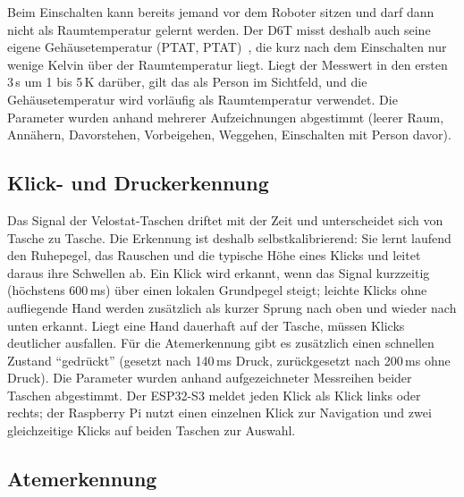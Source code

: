 Beim Einschalten kann bereits jemand vor dem Roboter sitzen und darf dann nicht als
Raumtemperatur gelernt werden. Der D6T misst deshalb auch seine eigene Gehäusetemperatur
(\acl{PTAT}, \acs{PTAT})~\cite{jamil2026mainboard}, die kurz nach dem Einschalten nur wenige Kelvin über der
Raumtemperatur liegt. Liegt der Messwert in den ersten 3\,s um 1 bis 5\,K darüber, gilt das als
Person im Sichtfeld, und die Gehäusetemperatur wird vorläufig als Raumtemperatur verwendet. Die
Parameter wurden anhand mehrerer Aufzeichnungen abgestimmt (leerer Raum, Annähern, Davorstehen,
Vorbeigehen, Weggehen, Einschalten mit Person davor).

\subsection{Klick- und Druckerkennung}
\label{sec:sw_druck}

Das Signal der Velostat-Taschen driftet mit der Zeit und unterscheidet sich von Tasche zu
Tasche. Die Erkennung ist deshalb selbstkalibrierend: Sie lernt laufend den Ruhepegel, das
Rauschen und die typische Höhe eines Klicks und leitet daraus ihre Schwellen ab. Ein Klick
wird erkannt, wenn das Signal kurzzeitig (höchstens 600\,ms) über einen lokalen Grundpegel
steigt; leichte Klicks ohne aufliegende Hand werden zusätzlich als kurzer Sprung nach oben und
wieder nach unten erkannt. Liegt eine Hand dauerhaft auf der Tasche, müssen Klicks deutlicher
ausfallen. Für die Atemerkennung gibt es zusätzlich einen schnellen Zustand \enquote{gedrückt}
(gesetzt nach 140\,ms Druck, zurückgesetzt nach 200\,ms ohne Druck). Die Parameter wurden anhand
aufgezeichneter Messreihen beider Taschen abgestimmt. Der ESP32-S3 meldet jeden Klick als Klick
links oder rechts; der Raspberry Pi nutzt einen einzelnen Klick zur Navigation und zwei
gleichzeitige Klicks auf beiden Taschen zur Auswahl.

\subsection{Atemerkennung}
\label{sec:sw_atem}

